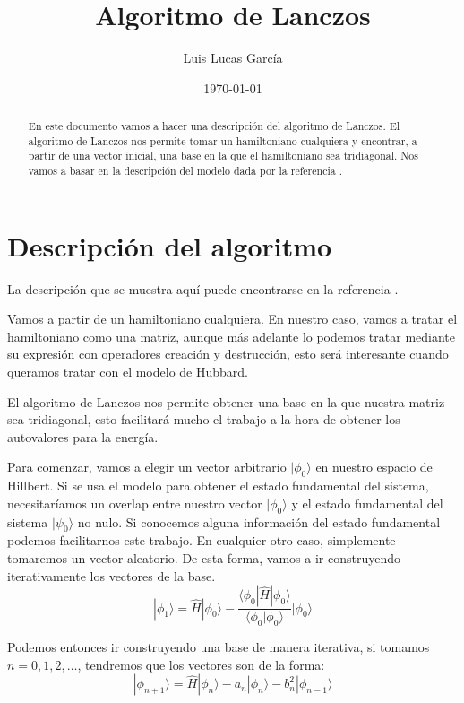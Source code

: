 \documentclass{article} %
\author{Luis Lucas García}
\title{Algoritmo de Lanczos}
\date{\today}
\begin{document}
\maketitle
\begin{abstract}
    En este documento vamos a hacer una descripción del algoritmo de Lanczos. El algoritmo de Lanczos nos permite tomar un hamiltoniano cualquiera y encontrar, a partir de una vector inicial, una base en la que el hamiltoniano sea tridiagonal. Nos vamos a basar en la descripción del modelo dada por la referencia \cite{RevModPhys.66.763}.
\end{abstract}
\tableofcontents
\section{Descripción del algoritmo}
La descripción que se muestra aquí puede encontrarse en la referencia \cite{RevModPhys.66.763}.

Vamos a partir de un hamiltoniano cualquiera. En nuestro caso, vamos a tratar el hamiltoniano como una matriz, aunque más adelante lo podemos tratar mediante su expresión con operadores creación y destrucción, esto será interesante cuando queramos tratar con el modelo de Hubbard.

El algoritmo de Lanczos nos permite obtener una base en la que nuestra matriz sea tridiagonal, esto facilitará mucho el trabajo a la hora de obtener los autovalores para la energía.

Para comenzar, vamos a elegir un vector arbitrario $|\phi_0\rangle$ en nuestro espacio de Hillbert. Si se usa el modelo para obtener el estado fundamental del sistema, necesitaríamos un overlap entre nuestro vector $|\phi_0\rangle$ y el estado fundamental del sistema $|\psi_0\rangle$ no nulo. Si conocemos alguna información del estado fundamental podemos facilitarnos este trabajo. En cualquier otro caso, simplemente tomaremos un vector aleatorio. De esta forma, vamos a ir construyendo iterativamente los vectores de la base.
$$
|\phi_1\rangle = \hat{H}|\phi_0\rangle - \frac{\langle\phi_0|\hat{H}|\phi_0\rangle}{\langle\phi_0|\phi_0\rangle}|\phi_0\rangle
$$

Podemos entonces ir construyendo una base de manera iterativa, si tomamos $n = 0, 1, 2, \ldots$, tendremos que los vectores son de la forma:
\begin{equation}
    |\phi_{n+1}\rangle = \hat{H}|\phi_n\rangle - a_n|\phi_n\rangle - b_n^2|\phi_{n-1}\rangle
\end{equation}
\end{document}
